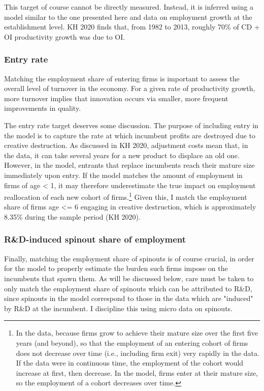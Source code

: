 \documentclass[11pt,english]{article}
\theoremstyle{remark}
\begin{document}
This target of course cannot be directly measured. Instead, it is inferred using a model similar to the one presented here and data on employment growth at the establishment level. KH 2020 finds that, from 1982 to 2013, roughly 70\% of CD + OI productivity growth was due to OI. 

\subsubsection{Entry rate}

Matching the employment share of entering firms is important to assess the overall level of turnover in the economy. For a given rate of productivity growth, more turnover implies that innovation occurs via smaller, more frequent improvements in quality. 

The entry rate target deserves some discussion. The purpose of including entry in the model is to capture the rate at which incumbent profits are destroyed due to creative destruction. As discussed in KH 2020, adjustment costs mean that, in the data, it can take several years for a new product to displace an old one. However, in the model, entrants that replace incumbents reach their mature size immediately upon entry. If the model matches the amount of employment in firms of age < 1, it may therefore underestimate the true impact on employment reallocation of each new cohort of firms.\footnote{In the data, because firms grow to achieve their mature size over the first five years (and beyond), so that the employment of an entering cohort of firms does not decrease over time (i.e., including firm exit) very rapidly in the data. If the data were in continuous time, the employment of the cohort would increase at first, then decrease. In the model, firms enter at their mature size, so the employment of a cohort decreases over time.} Given this, I match the employment share of firms age <= 6 engaging in creative destruction, which is approximately 8.35\% during the sample period (KH 2020).
 
\subsubsection{R\&D-induced spinout share of employment}

Finally, matching the employment share of spinouts is of course crucial, in order for the model to properly estimate the burden such firms impose on the incumbents that spawn them. As will be discussed below, care must be taken to only match the employment share of spinouts which can be attributed to R\&D, since spinouts in the model correspond to those in the data which are "induced" by R\&D at the incumbent. I discipline this using micro data on spinouts.
\end{document}
